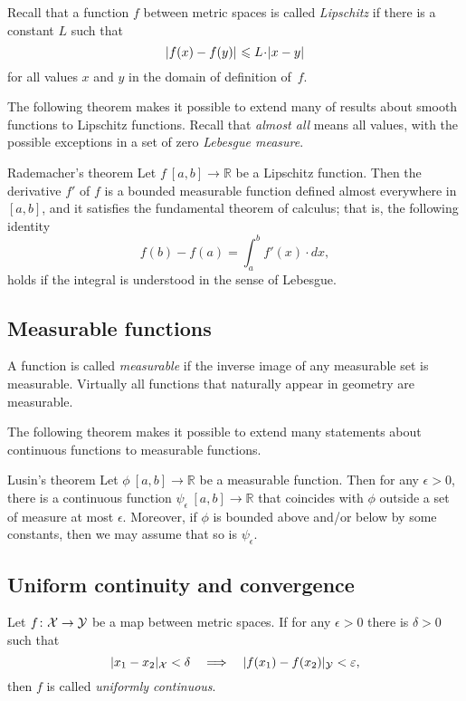 Recall that a function $f$ between metric spaces is called \emph{Lipschitz} if there is a constant $L$ such that 
\[\dist{f(x)}{f(y)}{}\le L\cdot\dist{x}{y}{}\]
for all values $x$ and $y$ in the domain of definition of~$f$.

The following theorem makes it possible to extend many of results about smooth functions to Lipschitz functions.
Recall that {}\emph{almost all} means all values, with the possible exceptions in a set of zero {}\emph{Lebesgue measure}.

\begin{thm}{Rademacher's theorem}\label{thm:rademacher}
Let $f\:[a,b]\to\mathbb{R}$ be a Lipschitz function.
Then the derivative $f'$ of $f$ is a bounded measurable function defined almost everywhere in $[a,b]$, and it satisfies the fundamental theorem of calculus; that is, the following identity 
\[f(b)-f(a)=\int_a^b f'(x)\cdot dx,\]
holds if the integral is understood in the sense of Lebesgue.
\end{thm}

\subsection*{Measurable functions}

A function is called \emph{measurable} if the inverse image of any measurable set is measurable.
Virtually all functions that naturally appear in geometry are measurable.

The following theorem makes it possible to extend many statements about continuous functions to measurable functions.

\begin{thm}{Lusin's theorem}\label{thm:lusin}
Let $\phi\:[a,b]\to \mathbb{R}$ be a measurable function.
Then for any $\epsilon>0$, there is a continuous function $\psi_\epsilon\:[a,b]\to \mathbb{R}$ that coincides with $\phi$ outside a set of measure at most $\epsilon$.
Moreover, if $\phi$ is bounded above and/or below by some constants, then we may assume that so is $\psi_\epsilon$.  
\end{thm}

\subsection*{Uniform continuity and convergence}

Let $f\colon{\mathcal{X}}\to \mathcal{Y}$ be a map between metric spaces.
If  for any $\epsilon>0$ there is $\delta>0$ such that 
\[\dist{x_1}{x_2}{\spc{X}}<\delta\quad\Longrightarrow\quad \dist{f(x_1)}{f(x_2)}{\spc{Y}}<\epsilon,\]
then $f$ is called \emph{uniformly continuous}.

